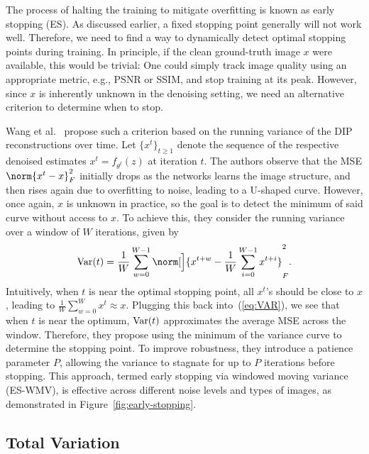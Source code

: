 The process of halting the training to mitigate overfitting is known as early stopping (ES).
As discussed earlier, a fixed stopping point generally will not work well.
Therefore, we need to find a way to dynamically detect optimal stopping points during training.
In principle, if the clean ground-truth image $x$ were available, this would be trivial:
One could simply track image quality using an appropriate metric, e.g., PSNR or SSIM, and stop training at its peak.
However, since $x$ is inherently unknown in the denoising setting, we need an alternative criterion to determine when to stop.

Wang et al.~\cite{ES} propose such a criterion based on the running variance of the DIP reconstructions over time.
Let $\{x^t\}_{t \geq 1}$ denote the sequence of the respective denoised estimates $x^t = f_{\theta^t}(z)$ at iteration $t$.
The authors observe that the MSE $\norm{x^t-x}_F^2$ initially drops as the networks learns the image structure, and then rises again due to overfitting to noise, leading to a U-shaped curve.
However, once again, $x$ is unknown in practice, so the goal is to detect the minimum of said curve without access to $x$.
To achieve this, they consider the running variance over a window of $W$ iterations, given by
\begin{equation}\label{eq:VAR}
    \Var(t) = \frac{1}{W} \sum_{w=0}^{W-1} \norm[\Big]{x^{t+w}-\frac{1}{W} \sum_{i=0}^{W-1} x^{t+i}}_F^2.
\end{equation}
Intuitively, when $t$ is near the optimal stopping point, all $x^t$'s should be close to $x$, leading to $\frac{1}{W} \sum_{w=0}^{W} x^t \approx x$.
Plugging this back into~(\ref{eq:VAR}), we see that when $t$ is near the optimum, $\operatorname{Var}(t)$ approximates the average MSE across the window.
Therefore, they propose using the minimum of the variance curve to determine the stopping point.
To improve robustness, they introduce a patience parameter $P$, allowing the variance to stagnate for up to $P$ iterations before stopping.
This approach, termed early stopping via windowed moving variance (ES-WMV), is effective across different noise levels and types of images, as demonstrated in Figure~\ref{fig:early-stopping}. 

\subsection{Total Variation}

